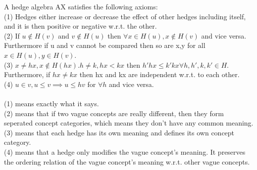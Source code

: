 \documentclass[26pt,fleqn,]{article}
\begin{document}
A hedge algebra AX satisfies the following  axioms:\\
{\indent
	(1) Hedges either increase or decrease the effect of other hedges including itself, and it is 
then positive or negative w.r.t. the other.\\}
{\indent
	(2) If \(u\notin H(v)\) and \(v\notin H(u)\) then \(\forall x\in H(u), x\notin H(v)\) and vice versa. 
	Furthermore if u and v cannot be compared then so are x,y for all \(x\in H(u), y\in H(v)\).
}\\
{\indent
	(3) \(x \not = hx, x \notin H(hx). h\neq k, hx<kx\) then \(h'hx\le k'kx\forall h,h',k,k'\in
	H.\) Furthermore, if \(hx \neq kx\) then hx and kx are independent w.r.t. to each other.
}\\
{\indent
	(4) \(u \in v, u \le v\implies u\le hv\) for \(\forall h\) and vice versa.
}
\\\\
(1) means exactly what it says.\\
(2) means that if two vague concepts are really different, then they form seperated concept categories,
which means they don't have any common meaning.\\
(3) means that each hedge has its own meaning and defines its own concept category.\\
(4) means that a hedge only modifies the vague concept's meaning. It preserves the ordering relation
of the vague concept's meaning w.r.t. other vague concepts.\\
\end{document}
